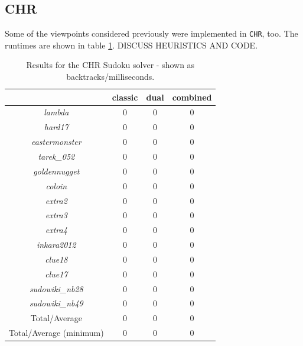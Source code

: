 \subsection{CHR}

Some of the viewpoints considered previously were implemented in \texttt{CHR}, too. The runtimes are shown in table \ref{tab:res4}. DISCUSS HEURISTICS AND CODE.

\begin{table}[H]
\centering
\bgroup
\def\arraystretch{1.3}
\begin{tabular}{cccc}
\multicolumn{1}{l}{} & classic & dual & combined \\ \hline
\textit{lambda} & 0 & 0 & 0  \\
\textit{hard17} & 0 & 0 & 0  \\
\textit{eastermonster} & 0 & 0 & 0  \\
\textit{tarek\_052} & 0 & 0 & 0  \\
\textit{goldennugget} & 0 & 0 & 0  \\
\textit{coloin} & 0 & 0 & 0  \\
\textit{extra2} & 0 & 0 & 0  \\
\textit{extra3} & 0 & 0 & 0  \\
\textit{extra4} & 0 & 0 & 0  \\
\textit{inkara2012} & 0 & 0 & 0  \\
\textit{clue18} & 0 & 0 & 0  \\
\textit{clue17} & 0 & 0 & 0  \\
\textit{sudowiki\_nb28} & 0 & 0 & 0  \\
\textit{sudowiki\_nb49} & 0 & 0 & 0  \\\hline
Total/Average & 0 & 0 & 0  \\
Total/Average (minimum) & 0 & 0 & 0                      
\end{tabular}
\egroup
\caption{Results for the CHR Sudoku solver - shown as backtracks/milliseconds.}
\label{tab:res4}
\end{table}